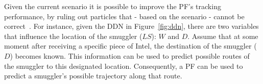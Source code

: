 \documentclass[conference]{IEEEtran}
\begin{document}
Given the current scenario it is possible to improve the PF's tracking performance, by ruling out particles that - based on the scenario - cannot be correct~\cite{Claessens2015}. For instance, given the DDN in Figure~\ref{fig:ddn}, there are two variables that influence the location of the smuggler ($LS$): $W$ and $D$. Assume that at some moment after receiving a specific piece of Intel, the destination of the smuggler ($D$) becomes known. This information can be used to predict possible routes of the smuggler to this designated location. Consequently, a PF can be used to predict a smuggler's possible trajectory along that route.



\end{document}
